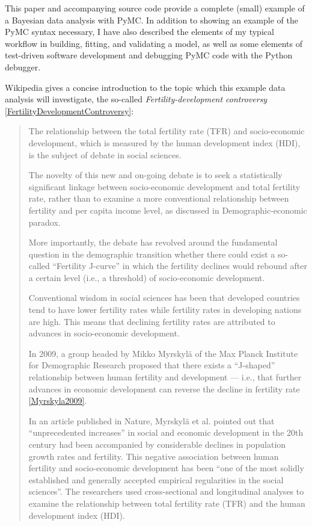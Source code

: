 \documentclass[10pt]{bmc_article}
\newenvironment{bmcformat}{\begin{raggedright}\baselineskip20pt\sloppy\setboolean{publ}{false}}{\end{raggedright}\baselineskip20pt\sloppy}
\begin{document}
\begin{bmcformat}
This paper and accompanying source code provide a complete (small)
example of a Bayesian data analysis with PyMC.  In addition to showing
an example of the PyMC syntax necessary, I have also described the
elements of my typical workflow in building, fitting, and validating a
model, as well as some elements of test-driven software development
and debugging PyMC code with the Python debugger.

Wikipedia gives a concise introduction to the topic which this example data analysis will investigate, the so-called \emph{Fertility-development controversy} \ref{FertilityDevelopmentControversy}:
\begin{quote}
The relationship between the total fertility rate (TFR) and
socio-economic development, which is measured by the human development
index (HDI), is the subject of debate in social sciences.

The novelty of this new and on-going debate is to seek a statistically
significant linkage between socio-economic development and total
fertility rate, rather than to examine a more conventional
relationship between fertility and per capita income level, as
discussed in Demographic-economic paradox.

More importantly, the debate has revolved around the fundamental
question in the demographic transition whether there could exist a
so-called ``Fertility J-curve'' in which the fertility declines would
rebound after a certain level (i.e., a threshold) of socio-economic
development.

Conventional wisdom in social sciences has been that developed
countries tend to have lower fertility rates while fertility rates in
developing nations are high. This means that declining fertility rates
are attributed to advances in socio-economic development.

In 2009, a group headed by Mikko Myrskylä of the Max Planck Institute
for Demographic Research proposed that there exists a ``J-shaped''
relationship between human fertility and development — i.e., that
further advances in economic development can reverse the decline in
fertility rate \ref{Myrskyla2009}.

In an article published in Nature, Myrskylä et al. pointed out that
“unprecedented increases” in social and economic development in the
20th century had been accompanied by considerable declines in
population growth rates and fertility. This negative association
between human fertility and socio-economic development has been “one
of the most solidly established and generally accepted empirical
regularities in the social sciences”. The researchers used
cross-sectional and longitudinal analyses to examine the relationship
between total fertility rate (TFR) and the human development index
(HDI).


\end{quote}
\end{bmcformat}
\end{document}
